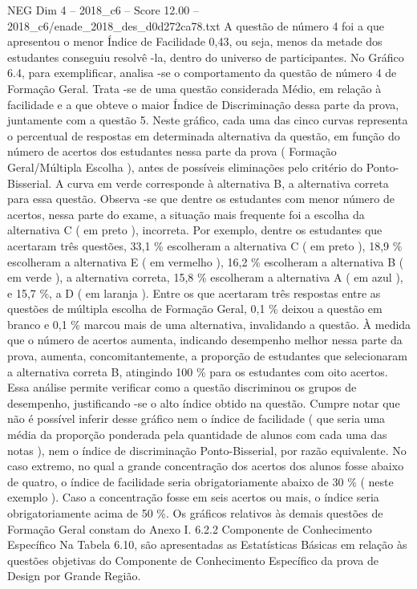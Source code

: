 \begin{textsample}{NEG Dim 4 – 2018\_c6 – Score 12.00 – 2018\_c6/enade\_2018\_des\_d0d272ca78.txt}
A questão de número 4 foi a que apresentou o menor Índice de Facilidade 0,43, ou seja, menos da metade dos estudantes conseguiu resolvê -la, dentro do universo de participantes.
No Gráfico 6.4, para exemplificar, analisa -se o comportamento da questão de número 4 de Formação Geral.
Trata -se de uma questão considerada Médio, em relação à facilidade e a que obteve o maior Índice de Discriminação dessa parte da prova, juntamente com a questão 5.
Neste gráfico, cada uma das cinco curvas representa o percentual de respostas em determinada alternativa da questão, em função do número de acertos dos estudantes nessa parte da prova ( Formação Geral/Múltipla Escolha ), antes de possíveis eliminações pelo critério do Ponto-Bisserial.
A curva em verde corresponde à alternativa B, a alternativa correta para essa questão.
Observa -se que dentre os estudantes com menor número de acertos, nessa parte do exame, a situação mais frequente foi a escolha da alternativa C ( em preto ), incorreta.
Por exemplo, dentre os estudantes que acertaram três questões, 33,1 \% escolheram a alternativa C ( em preto ), 18,9 \% escolheram a alternativa E ( em vermelho ), 16,2 \% escolheram a alternativa B ( em verde ), a alternativa correta, 15,8 \% escolheram a alternativa A ( em azul ), e 15,7 \%, a D ( em laranja ).
Entre os que acertaram três respostas entre as questões de múltipla escolha de Formação Geral, 0,1 \% deixou a questão em branco e 0,1 \% marcou mais de uma alternativa, invalidando a questão.
À medida que o número de acertos aumenta, indicando desempenho melhor nessa parte da prova, aumenta, concomitantemente, a proporção de estudantes que selecionaram a alternativa correta B, atingindo 100 \% para os estudantes com oito acertos.
Essa análise permite verificar como a questão discriminou os grupos de desempenho, justificando -se o alto índice obtido na questão.
Cumpre notar que não é possível inferir desse gráfico nem o índice de facilidade ( que seria uma média da proporção ponderada pela quantidade de alunos com cada uma das notas ), nem o índice de discriminação Ponto-Bisserial, por razão equivalente.
No caso extremo, no qual a grande concentração dos acertos dos alunos fosse abaixo de quatro, o índice de facilidade seria obrigatoriamente abaixo de 30 \% ( neste exemplo ).
Caso a concentração fosse em seis acertos ou mais, o índice seria obrigatoriamente acima de 50 \%.
Os gráficos relativos às demais questões de Formação Geral constam do Anexo I. 6.2.2 Componente de Conhecimento Específico Na Tabela 6.10, são apresentadas as Estatísticas Básicas em relação às questões objetivas do Componente de Conhecimento Específico da prova de Design por Grande Região.

\end{textsample}
